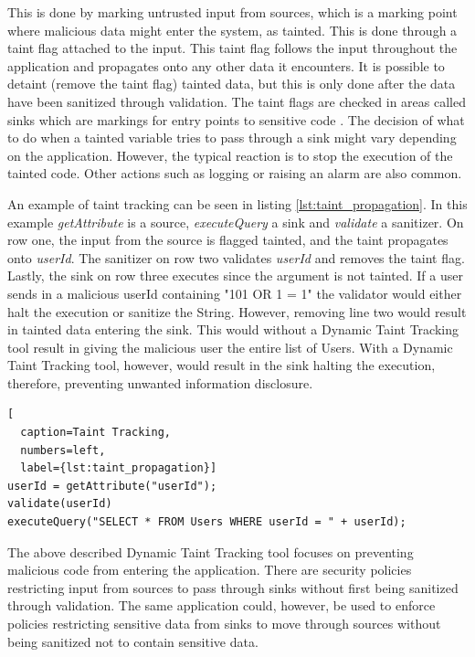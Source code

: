 This is done by marking untrusted input from sources, which is a marking point where malicious data might enter the system, as tainted. This is done through a taint flag attached to the input. This taint flag follows the input throughout the application and propagates onto any other data it encounters. It is possible to detaint (remove the taint flag) tainted data, but this is only done after the data have been sanitized through validation. The taint flags are checked in areas called sinks which are markings for entry points to sensitive code \parencite{Pan2015, Venkataramani2008}. The decision of what to do when a tainted variable tries to pass through a sink might vary depending on the application. However, the typical reaction is to stop the execution of the tainted code. Other actions such as logging or raising an alarm are also common.

An example of taint tracking can be seen in listing \ref{lst:taint_propagation}. In this example \textit{getAttribute} is a source, \textit{executeQuery} a sink and \textit{validate} a sanitizer. On row one, the input from the source is flagged tainted, and the taint propagates onto \textit{userId}. The sanitizer on row two validates \textit{userId} and removes the taint flag. Lastly, the sink on row three executes since the argument is not tainted. If a user sends in a malicious userId containing "101 OR 1 = 1" the validator would either halt the execution or sanitize the String. However, removing line two would result in tainted data entering the sink. This would without a Dynamic Taint Tracking tool result in giving the malicious user the entire list of Users. With a Dynamic Taint Tracking tool, however, would result in the sink halting the execution, therefore, preventing unwanted information disclosure.

\hfill
\begin{lstlisting}[
  caption=Taint Tracking,
  numbers=left,
  label={lst:taint_propagation}]
userId = getAttribute("userId");
validate(userId)
executeQuery("SELECT * FROM Users WHERE userId = " + userId);
\end{lstlisting}
\hfill

The above described Dynamic Taint Tracking tool focuses on preventing malicious code from entering the application. There are security policies restricting input from sources to pass through sinks without first being sanitized through validation. The same application could, however, be used to enforce policies restricting sensitive data from sinks to move through sources without being sanitized not to contain sensitive data.

